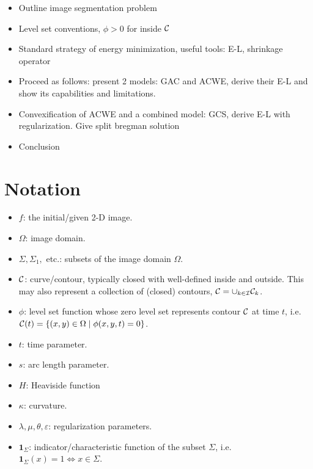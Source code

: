 \begin{itemize}
	\item Outline image segmentation problem 
	
	\item Level set conventions, $\phi>0$ for inside $\mathcal{C}$
	
	\item Standard strategy of energy minimization, useful tools: E-L, shrinkage operator
	
	\item Proceed as follows: present 2 models: GAC and ACWE, derive their E-L and show its capabilities and limitations.
	
	\item Convexification of ACWE and a combined model: GCS, derive E-L with regularization. Give split bregman solution
	
	\item Conclusion
\end{itemize}

\section{Notation}
\begin{itemize}
	\item $f$: the initial/given 2-D image.
	
	\item $\Omega$: image domain.
	
	\item $\Sigma, \Sigma_1,$ etc.: subsets of the image domain $\Omega$.
	
	\item $\mathcal{C}$: curve/contour, typically closed with well-defined inside and outside. This may also represent a collection of (closed) contours, $\mathcal{C} = \cup_{k \in \mathcal{I}} \mathcal{C}_k$.
	
	\item $\phi$: level set function whose zero level set represents contour $\mathcal{C}$ at time $t$, i.e. $\mathcal{C}(t) = \{(x,y) \in \Omega \mid \phi(x,y,t) = 0\}$. 
	
	\item $t$: time parameter. 
	
	\item $s$: arc length parameter.
	
	\item $H$: Heaviside function
	
	\item $\kappa$: curvature. 
	
	\item $\lambda, \mu, \theta, \varepsilon$: regularization parameters.
	
	\item $\mathbf{1}_\Sigma$: indicator/characteristic function of the subset $\Sigma$, i.e. $\mathbf{1}_\Sigma(x) = 1 \iff x \in \Sigma$.
	
\end{itemize}